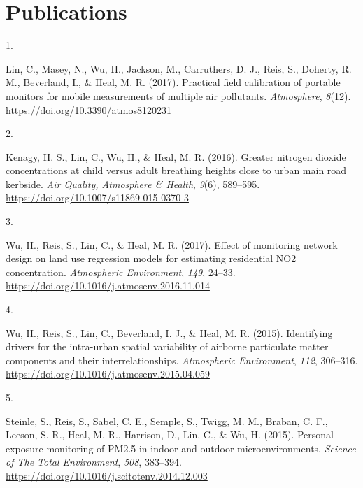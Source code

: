 \documentclass[11pt,a4paper,]{moderncv}
\newlength{\cslhangindent}
\newlength{\csllabelwidth}
\newenvironment{CSLReferences}[2] %
 {\begin{list}{}{%
  \setlength{\itemindent}{0pt}
  \setlength{\leftmargin}{0pt}
  \setlength{\parsep}{0pt}
  \ifodd #1
   \setlength{\leftmargin}{\cslhangindent}
   \setlength{\itemindent}{-1\cslhangindent}
  \fi
  \setlength{\itemsep}{#2\baselineskip}}}
 {\end{list}}
\newcommand{\CSLLeftMargin}[1]{\parbox[t]{\csllabelwidth}{\strut#1\strut}}
\newcommand{\CSLRightInline}[1]{\parbox[t]{\linewidth - \csllabelwidth}{\strut#1\strut}}
\begin{document}
\nopagebreak

\section{Publications}\label{publications}

\label{refs-75d88f064d195362f6ac9937848a54ab}
\begin{CSLReferences}{0}{0}
\CSLLeftMargin{1. }%
\CSLRightInline{Lin, C., Masey, N., Wu, H., Jackson, M., Carruthers, D.
J., Reis, S., Doherty, R. M., Beverland, I., \& Heal, M. R. (2017).
Practical field calibration of portable monitors for mobile measurements
of multiple air pollutants. \emph{Atmosphere}, \emph{8}(12).
\url{https://doi.org/10.3390/atmos8120231}}

\CSLLeftMargin{2. }%
\CSLRightInline{Kenagy, H. S., Lin, C., Wu, H., \& Heal, M. R. (2016).
Greater nitrogen dioxide concentrations at child versus adult breathing
heights close to urban main road kerbside. \emph{Air Quality, Atmosphere
\& Health}, \emph{9}(6), 589--595.
\url{https://doi.org/10.1007/s11869-015-0370-3}}

\CSLLeftMargin{3. }%
\CSLRightInline{Wu, H., Reis, S., Lin, C., \& Heal, M. R. (2017). Effect
of monitoring network design on land use regression models for
estimating residential NO2 concentration. \emph{Atmospheric
Environment}, \emph{149}, 24--33.
\url{https://doi.org/10.1016/j.atmosenv.2016.11.014}}

\CSLLeftMargin{4. }%
\CSLRightInline{Wu, H., Reis, S., Lin, C., Beverland, I. J., \& Heal, M.
R. (2015). Identifying drivers for the intra-urban spatial variability
of airborne particulate matter components and their interrelationships.
\emph{Atmospheric Environment}, \emph{112}, 306--316.
\url{https://doi.org/10.1016/j.atmosenv.2015.04.059}}

\CSLLeftMargin{5. }%
\CSLRightInline{Steinle, S., Reis, S., Sabel, C. E., Semple, S., Twigg,
M. M., Braban, C. F., Leeson, S. R., Heal, M. R., Harrison, D., Lin, C.,
\& Wu, H. (2015). Personal exposure monitoring of PM2.5 in indoor and
outdoor microenvironments. \emph{Science of The Total Environment},
\emph{508}, 383--394.
\url{https://doi.org/10.1016/j.scitotenv.2014.12.003}}

\end{CSLReferences}
\end{document}
